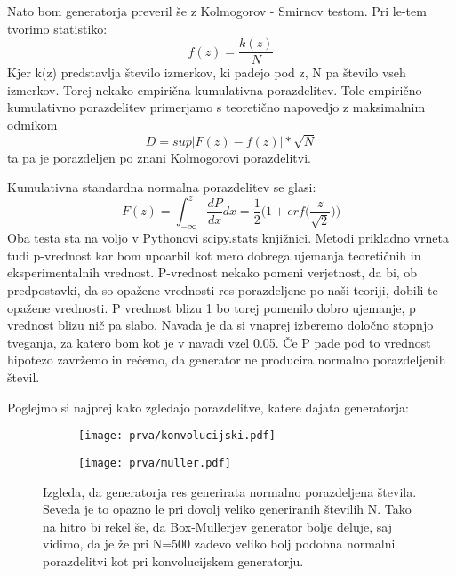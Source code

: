 \documentclass{article}
\begin{document}
Nato bom generatorja preveril še z Kolmogorov - Smirnov testom. Pri le-tem tvorimo statistiko:
\begin{equation*}
f(z) = \frac{k(z)}{N}
\end{equation*}
Kjer k(z) predstavlja število izmerkov, ki padejo pod z, N pa število vseh izmerkov. Torej nekako empirična kumulativna porazdelitev. Tole empirično kumulativno porazdelitev primerjamo s teoretično napovedjo z maksimalnim odmikom
\begin{equation*}
D = sup|F(z) - f(z)|*\sqrt{N}
\end{equation*}
ta pa je porazdeljen po znani Kolmogorovi porazdelitvi.

Kumulativna standardna normalna porazdelitev se glasi:
\begin{equation*}
F(z) = \int_{-\infty}^{z} \frac{dP}{dx} dx = \frac{1}{2} \Big(1+erf\Big(\frac{z}{\sqrt{2}}\Big)\Big)
\end{equation*}
Oba testa sta na voljo v Pythonovi scipy.stats knjižnici. Metodi prikladno vrneta tudi p-vrednost kar bom upoarbil kot mero dobrega ujemanja teoretičnih in eksperimentalnih vrednost. P-vrednost nekako pomeni verjetnost, da bi, ob predpostavki, da so opažene vrednosti res porazdeljene po naši teoriji, dobili te opažene vrednosti. P vrednost blizu 1 bo torej pomenilo dobro ujemanje, p vrednost blizu nič pa slabo.  Navada je da si vnaprej izberemo določno stopnjo tveganja, za katero bom kot je v navadi vzel 0.05. Če P pade pod to vrednost hipotezo zavržemo in rečemo, da generator ne producira normalno porazdeljenih števil. 


Poglejmo si najprej kako zgledajo porazdelitve, katere dajata generatorja:

\begin{figure}[H]
\centering
\begin{subfigure}{.49\textwidth}
\texttt{[image: prva/konvolucijski.pdf]}
\end{subfigure}
\begin{subfigure}{.49\textwidth}
\texttt{[image: prva/muller.pdf]}
\end{subfigure}
\caption*{Izgleda, da generatorja res generirata normalno porazdeljena števila. Seveda je to opazno le pri dovolj veliko generiranih številih N. Tako na hitro bi rekel še, da Box-Mullerjev generator bolje deluje, saj vidimo, da je že pri N=500 zadevo veliko bolj podobna normalni porazdelitvi kot pri konvolucijskem generatorju.}
\end{figure}
\end{document}
